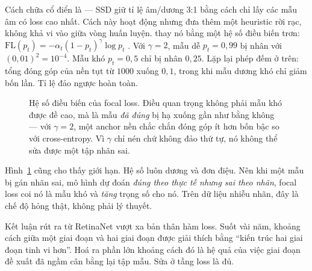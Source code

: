 \documentclass[../../../deep_learning.tex]{subfiles}
\begin{document}
Cách chữa cổ điển là  --- SSD giữ tỉ lệ âm/dương 3:1 bằng cách chỉ lấy các mẫu âm có loss cao nhất. Cách này hoạt động nhưng đưa thêm một heuristic rời rạc, không khả vi vào giữa vòng huấn luyện.  thay nó bằng một hệ số điều biến trơn: \(\mathrm{FL}(p_t) = -\alpha_t (1-p_t)^{\gamma}\log p_t\) \cite{lin2017focal}. Với \(\gamma = 2\), mẫu dễ \(p_t = 0{,}99\) bị nhân với \((0{,}01)^2 = 10^{-4}\). Mẫu khó \(p_t = 0{,}5\) chỉ bị nhân \(0{,}25\). Lặp lại phép đếm ở trên: tổng đóng góp của nền tụt từ \(1000\) xuống \(0{,}1\), trong khi mẫu dương khó chỉ giảm bốn lần. Tỉ lệ đảo ngược hoàn toàn.

\begin{figure}[H]\centering
{}
\caption{Hệ số điều biến của focal loss. Điều quan trọng không phải mẫu khó được đề cao, mà là mẫu \emph{đã đúng} bị hạ xuống gần như bằng không --- với \(\gamma=2\), một anchor nền chắc chắn đóng góp ít hơn bốn bậc so với cross-entropy. Vì \(\gamma\) chỉ nén chứ không đảo thứ tự, nó không thể sửa được một tập nhãn sai.}
\label{fig:focal-modulation}
\end{figure}

Hình~\ref{fig:focal-modulation} cũng cho thấy giới hạn. Hệ số luôn dương và đơn điệu. Nên khi một mẫu bị gán nhãn sai, mô hình dự đoán \emph{đúng theo thực tế nhưng sai theo nhãn}, focal loss coi nó là mẫu khó và \emph{tăng} trọng số cho nó. Trên dữ liệu nhiễu nhãn, đây là chế độ hỏng thật, không phải lý thuyết.

Kết luận rút ra từ RetinaNet vượt xa bản thân hàm loss. Suốt vài năm, khoảng cách giữa một giai đoạn và hai giai đoạn được giải thích bằng ``kiến trúc hai giai đoạn tinh vi hơn''. Hoá ra phần lớn khoảng cách đó là hệ quả của việc giai đoạn đề xuất đã ngầm cân bằng lại tập mẫu. Sửa ở tầng loss là đủ.
\end{document}
